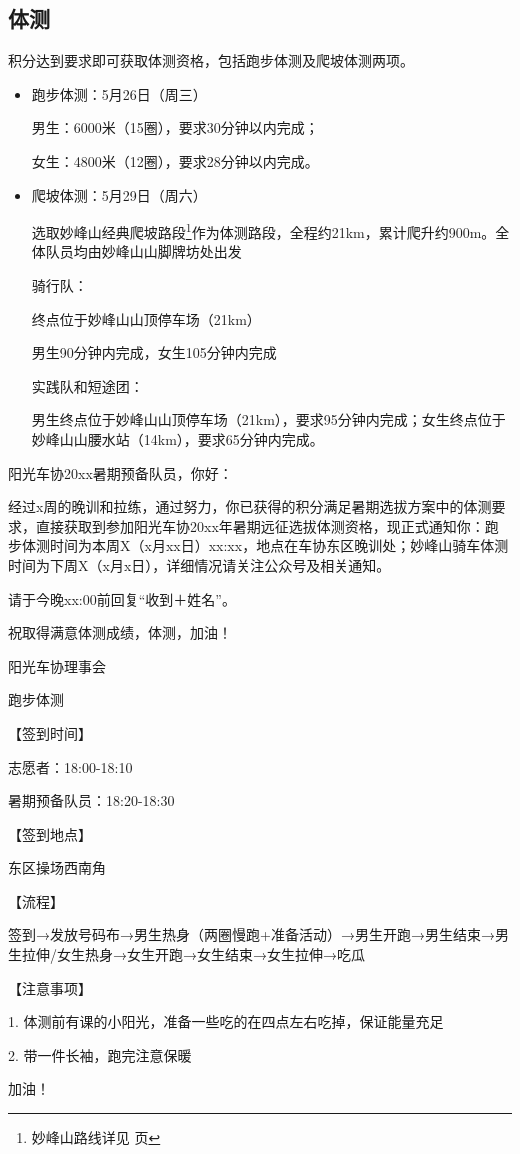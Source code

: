 \documentclass{ctexbook}
\begin{document}
\subsection{体测}

积分达到要求即可获取体测资格，包括跑步体测及爬坡体测两项。
\begin{itemize}

\item 跑步体测：5月26日（周三）

男生：6000米（15圈），要求30分钟以内完成；

女生：4800米（12圈），要求28分钟以内完成。

\item 爬坡体测：5月29日（周六）

选取妙峰山经典爬坡路段\footnote{妙峰山路线详见 \pageref{subsec:妙峰山} 页}作为体测路段，全程约21km，累计爬升约900m。全体队员均由妙峰山山脚牌坊处出发

骑行队：

终点位于妙峰山山顶停车场（21km）

男生90分钟内完成，女生105分钟内完成

实践队和短途团：

男生终点位于妙峰山山顶停车场（21km），要求95分钟内完成；女生终点位于妙峰山山腰水站（14km），要求65分钟内完成。

\end{itemize}
\begin{tcolorbox}[title=暑期跑步体测短信模板]
    
阳光车协20xx暑期预备队员，你好：

经过x周的晚训和拉练，通过努力，你已获得的积分满足暑期选拔方案中的体测要求，直接获取到参加阳光车协20xx年暑期远征选拔体测资格，现正式通知你：跑步体测时间为本周X（x月xx日）xx:xx，地点在车协东区晚训处；妙峰山骑车体测时间为下周X（x月x日），详细情况请关注公众号及相关通知。

请于今晚xx:00前回复“收到＋姓名”。

祝取得满意体测成绩，体测，加油！

阳光车协理事会
\end{tcolorbox}
\begin{tcolorbox}

跑步体测

【签到时间】

志愿者：18:00-18:10

暑期预备队员：18:20-18:30

【签到地点】

东区操场西南角

【流程】

签到→发放号码布→男生热身（两圈慢跑+准备活动）→男生开跑→男生结束→男生拉伸/女生热身→女生开跑→女生结束→女生拉伸→吃瓜

【注意事项】

1. 体测前有课的小阳光，准备一些吃的在四点左右吃掉，保证能量充足

2. 带一件长袖，跑完注意保暖

加油！
\end{tcolorbox}
\end{document}
